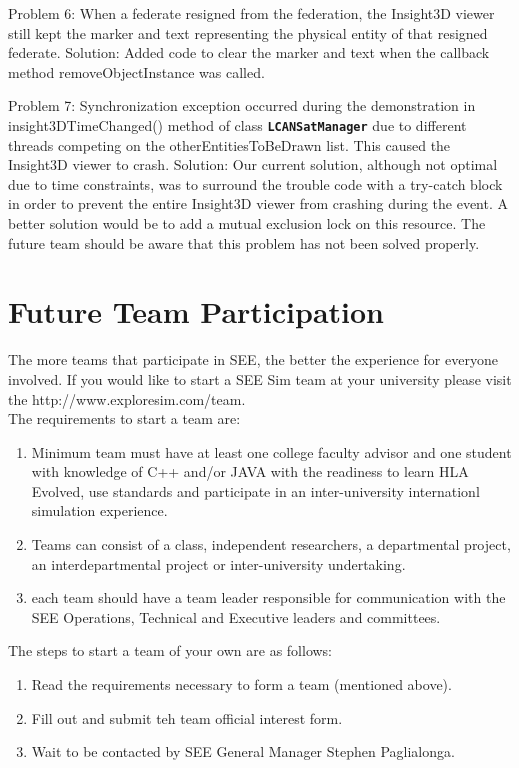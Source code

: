 \documentclass[conference]{IEEEtran}
\newcommand\uml[1]{\texttt{\textbf{#1}}}
\begin{document}
Problem 6: When a federate resigned from the federation, the Insight3D viewer still kept the marker and text representing the physical entity of that resigned federate.
Solution: Added code to clear the marker and text when the callback method removeObjectInstance was called.

Problem 7: Synchronization exception occurred during the demonstration in insight3DTimeChanged() method of class \uml{LCANSatManager} due to different threads competing on the otherEntitiesToBeDrawn list. This caused the Insight3D viewer to crash.
Solution: Our current solution, although not optimal due to time constraints, was to surround the trouble code with a try-catch block in order to prevent the entire Insight3D viewer from crashing during the event. A better solution would be to add a mutual exclusion lock on this resource. The future team should be aware that this problem has not been solved properly.

\section{Future Team Participation}
The more teams that participate in SEE, the better the experience for everyone involved.  If you would like to start a SEE Sim team at your university please visit the http://www.exploresim.com/team.\\
The requirements to start a team are:
\begin{enumerate}
	\item Minimum team must have at least one college faculty advisor and one student with knowledge of C++ and/or JAVA with the readiness to learn HLA 	 		Evolved, use standards and participate in an inter-university internationl simulation experience.  
	\item Teams can consist of a class, independent researchers, a departmental project, an interdepartmental project or inter-university undertaking.
	\item each team should have a team leader responsible for communication with the SEE Operations, Technical and Executive leaders and committees.
\end{enumerate}

The steps to start a team of your own are as follows:
\begin{enumerate}
	\item Read the requirements necessary to form a team (mentioned above).
	\item Fill out and submit teh team official interest form.
	\item Wait to be contacted by SEE General Manager Stephen Paglialonga.
\end{enumerate}
\end{document}
